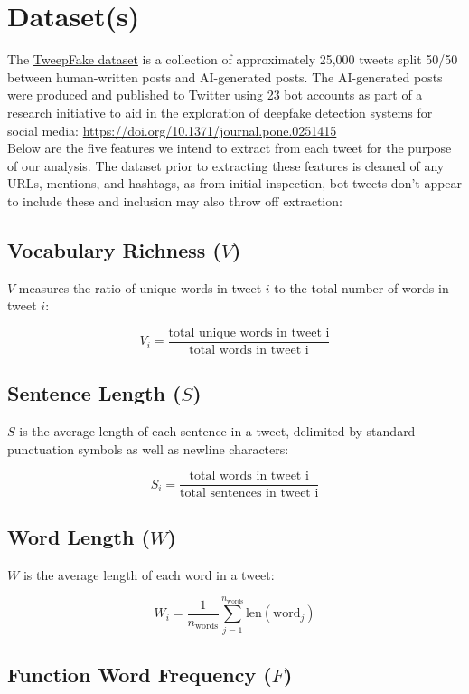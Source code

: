 \section*{Dataset(s)}

The \href{https://www.kaggle.com/datasets/mtesconi/twitter-deep-fake-text}{TweepFake dataset} is a collection of approximately 25,000 tweets split 50/50 between human-written posts and AI-generated posts. The AI-generated posts were produced and published to Twitter using 23 bot accounts as part of a research initiative to aid in the exploration of deepfake detection systems for social media: \href{https://doi.org/10.1371/journal.pone.0251415}{https://doi.org/10.1371/journal.pone.0251415}\\

Below are the five features we intend to extract from each tweet for the purpose of our analysis. The dataset prior to extracting these features is cleaned of any URLs, mentions, and hashtags, as from initial inspection, bot tweets don't appear to include these and inclusion may also throw off extraction:

\subsection*{Vocabulary Richness ($ V $)}
$ V $ measures the ratio of unique words in tweet $ i $ to the total number of words in tweet $ i $: 

$$ V_i = \frac{\text{total unique words in tweet i}}{\text{total words in tweet i}} $$ 

\subsection*{Sentence Length ($ S $)}
$ S $ is the average length of each sentence in a tweet, delimited by standard punctuation symbols as well as newline characters:

$$ S_i = \frac{\text{total words in tweet i}}{\text{total sentences in tweet i}} $$

\subsection*{Word Length ($W$)}
$ W $ is the average length of each word in a tweet:

$$ W_i = \frac{1}{n_{\text{words}}} \sum_{j=1}^{n_{\text{words}}} \text{len}(\text{word}_j) $$

\subsection*{Function Word Frequency ($F$)}

